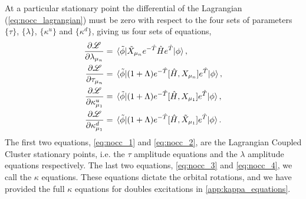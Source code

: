     At a particular stationary point the differential of the Lagrangian
    (\autoref{eq:nocc_lagrangian}) must be zero with respect to the four sets of 
    parameters $\{\tau\}$, $\{\lambda\}$, $\{\kappa^u\}$ and $\{\kappa^d\}$, giving
    us four sets of equations,
    \begin{align}
        \frac{\partial \mathscr{L}}{\partial \lambda_{\mu_n}}
            &= \mel*{\tilde{\phi}}
            {\tilde{X}_{\mu_n} e^{-\hat{T}}\hat{H}e^{\hat{T}}}
            {\phi}, 
            \label{eq:nocc_1} \\
        \frac{\partial \mathscr{L}}{\partial \tau_{\mu_n}}
            &= \mel*{\tilde{\phi}}
            {(1 + \Lambda)e^{-\hat{T}}[\hat{H}, X_{\mu_n}]e^{\hat{T}}}
            {\phi}, 
            \label{eq:nocc_2} \\
        \frac{\partial \mathscr{L}}{\partial \kappa^u_{\mu_1}}
            &= \mel*{\tilde{\phi}}
            {(1 + \Lambda)e^{-\hat{T}}[\hat{H}, X_{\mu_1}]e^{\hat{T}}}
            {\phi}, 
            \label{eq:nocc_3} \\
        \frac{\partial \mathscr{L}}{\partial \kappa^d_{\mu_1}}
            &= \mel*{\tilde{\phi}}
            {(1 + \Lambda)e^{-\hat{T}}[\hat{H}, \tilde{X}_{\mu_1}]e^{\hat{T}}}
            {\phi}.
            \label{eq:nocc_4}
    \end{align}
    The first two equations, \autoref{eq:nocc_1} and \autoref{eq:nocc_2},
    are the Lagrangian Coupled Cluster stationary points, i.e. the $\tau$ 
    amplitude equations and the $\lambda$ amplitude equations respectively. 
    The last two equations, \autoref{eq:nocc_3} and \autoref{eq:nocc_4},
    we call the $\kappa$ equations. These equations dictate the orbital rotations,
    and we have provided the full $\kappa$ equations for doubles excitations 
    in \autoref{app:kappa_equations}.

